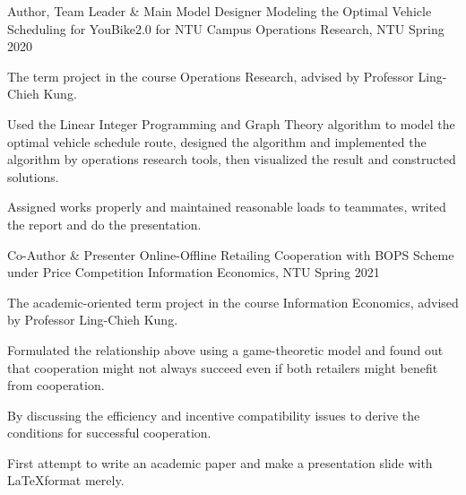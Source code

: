 

\begin{cventries}

  \cventry
    {Author, Team Leader \& Main Model Designer} %
    {Modeling the Optimal Vehicle Scheduling for YouBike2.0 for NTU Campus} %
    {Operations Research, NTU} %
    {Spring 2020} %
    {
      \begin{cvitems} %
        \item {The term project in the course Operations Research, 
            advised by Professor Ling-Chieh Kung.}
        \item {Used the Linear Integer Programming and Graph Theory
                algorithm to model the 
            optimal vehicle schedule route, designed the algorithm and implemented
            the algorithm by operations research tools, then visualized the result and
            constructed solutions.}
        \item {Assigned works properly and maintained reasonable loads to teammates,
            writed the report and do the presentation.}
      \end{cvitems}
    }

  \cventry
    {Co-Author \& Presenter}
    {Online-Offline Retailing Cooperation with BOPS Scheme under Price Competition}
    {Information Economics, NTU}
    {Spring 2021}
    {
        \begin{cvitems}
            \item {The academic-oriented term project in the course Information Economics,
                advised by Professor Ling-Chieh Kung.}
            \item {Formulated the relationship above using a game-theoretic model
                and found out that cooperation might not always succeed even if both
                retailers might benefit from cooperation.}
            \item {By discussing the efficiency and incentive compatibility issues to
                derive the conditions for successful cooperation.}
            \item {First attempt to write an academic paper and make a presentation
                slide with \LaTeX format merely.}
        \end{cvitems}
    }



\end{cventries}
